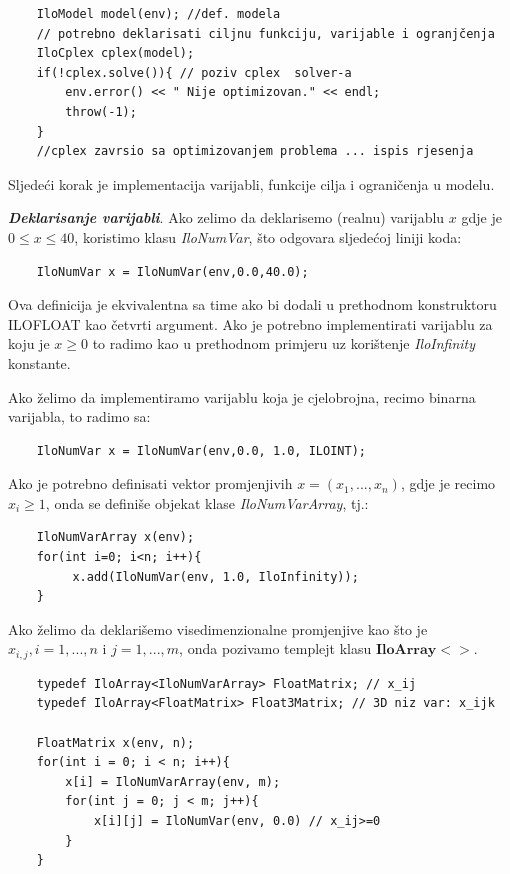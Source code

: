 \documentclass[a4paper, utf8, 11pt, colorlinks]{book}
\begin{document}
 \begin{verbatim}
 	IloModel model(env); //def. modela
 	// potrebno deklarisati ciljnu funkciju, varijable i ogranjčenja
 	IloCplex cplex(model);
 	if(!cplex.solve()){ // poziv cplex  solver-a
 		env.error() << " Nije optimizovan." << endl;
 		throw(-1);
 	}
 	//cplex zavrsio sa optimizovanjem problema ... ispis rjesenja
 \end{verbatim}
 
 \noindent Sljedeći korak je implementacija varijabli, funkcije cilja i ograničenja u modelu. 
 
 \noindent \textbf{\emph{Deklarisanje varijabli}}. Ako zelimo da deklarisemo (realnu) varijablu $x$ gdje je $0 \leq x \leq 40$, koristimo klasu \emph{IloNumVar}, što odgovara sljedećoj liniji koda:
 \begin{verbatim}
 	IloNumVar x = IloNumVar(env,0.0,40.0);
 \end{verbatim}
 Ova definicija je ekvivalentna sa time ako bi dodali u prethodnom konstruktoru ILOFLOAT kao četvrti argument. 
Ako je potrebno implementirati varijablu za koju je $x \geq 0$ to radimo kao u prethodnom primjeru uz korištenje  \emph{IloInfinity} konstante.
 
 Ako želimo da implementiramo varijablu koja je cjelobrojna, recimo binarna varijabla, to radimo sa:
 \begin{verbatim}
 	IloNumVar x = IloNumVar(env,0.0, 1.0, ILOINT);
 \end{verbatim}
 
 \noindent Ako je potrebno definisati vektor promjenjivih $x=(x_1,...,x_n)$, gdje je recimo $x_i \geq 1$, onda se definiše objekat klase \emph{IloNumVarArray}, tj.:
 \begin{verbatim}
 	IloNumVarArray x(env);
 	for(int i=0; i<n; i++){
 		 x.add(IloNumVar(env, 1.0, IloInfinity));
 	}
 \end{verbatim}
 
 \noindent Ako želimo da deklarišemo visedimenzionalne promjenjive kao što je $x_{i,j}, i=1,...,n$ i $j=1,...,m$, onda pozivamo templejt klasu $\textbf{IloArray}<>$.
 
 \begin{verbatim}
 	typedef IloArray<IloNumVarArray> FloatMatrix; // x_ij 
 	typedef IloArray<FloatMatrix> Float3Matrix; // 3D niz var: x_ijk
 	
 	FloatMatrix x(env, n);
 	for(int i = 0; i < n; i++){
 		x[i] = IloNumVarArray(env, m);
 		for(int j = 0; j < m; j++){
 			x[i][j] = IloNumVar(env, 0.0) // x_ij>=0
 		}
 	}
 \end{verbatim}
 
\end{document}
